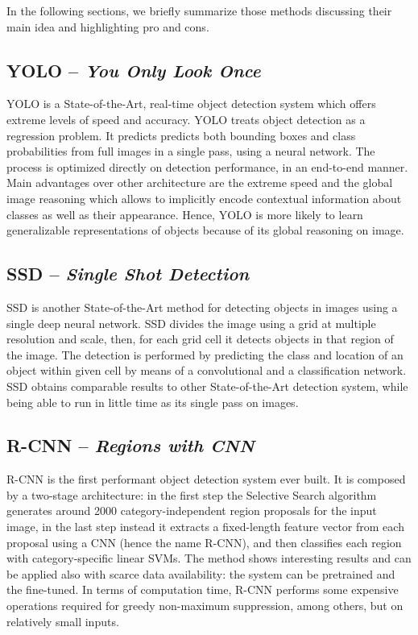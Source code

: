 In the following sections, we briefly summarize those methods
discussing their main idea and highlighting pro and cons.

\subsection{YOLO -- \emph{You Only Look Once}}
\label{subsec:yolo}

YOLO \cite{redmon2016you} is a State-of-the-Art, real-time object
detection system which offers extreme levels of speed and accuracy.
YOLO treats object detection as a regression problem. It predicts
predicts both bounding boxes and class probabilities from full images
in a single pass, using a neural network. The process is optimized
directly on detection performance, in an end-to-end manner. Main
advantages over other architecture are the extreme speed and the
global image reasoning which allows to implicitly encode contextual
information about classes as well as their appearance. Hence, YOLO is
more likely to learn generalizable representations of objects because
of its global reasoning on image.

\subsection{SSD -- \emph{Single Shot Detection}}

SSD \cite{liu2016ssd} is another State-of-the-Art method for detecting
objects in images using a single deep neural network. SSD divides the
image using a grid at multiple resolution and scale, then, for each
grid cell it detects objects in that region of the image. The
detection is performed by predicting the class and location of an
object within given cell by means of a convolutional and a
classification network. SSD obtains comparable results to other
State-of-the-Art detection system, while being able to run in little
time as its single pass on images.

\subsection{R-CNN -- \emph{Regions with CNN}}

R-CNN \cite{girshick2014rich} is the first performant object detection
system ever built. It is composed by a two-stage architecture: in the
first step the Selective Search algorithm generates around 2000
category-independent region proposals for the input image, in the last
step instead it extracts a fixed-length feature vector from each
proposal using a CNN (hence the name R-CNN), and then classifies each
region with category-specific linear SVMs. The method shows
interesting results and can be applied also with scarce data
availability: the system can be pretrained and the fine-tuned. In
terms of computation time, R-CNN performs some expensive operations
required for greedy non-maximum suppression, among others, but on
relatively small inputs.

